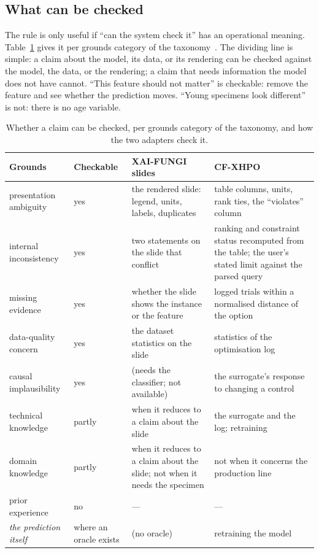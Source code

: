 \documentclass[preprint,12pt,3p,times]{elsarticle}
\begin{document}
\subsection{What can be checked}
\label{sec:checkable}

The rule is only useful if ``can the system check it'' has an operational meaning. Table~\ref{tab:grounds} gives it per grounds category of the taxonomy~\cite{phase1}. The dividing line is simple: a claim about the model, its data, or its rendering can be checked against the model, the data, or the rendering; a claim that needs information the model does not have cannot. ``This feature should not matter'' is checkable: remove the feature and see whether the prediction moves. ``Young specimens look different'' is not: there is no age variable.

\begin{table}[t]
\centering
\caption{Whether a claim can be checked, per grounds category of the taxonomy, and how the two adapters check it.}
\label{tab:grounds}
\small
\begin{tabular}{llp{4.6cm}p{4.6cm}}
\toprule
Grounds & Checkable & XAI-FUNGI slides & CF-XHPO \\
\midrule
presentation ambiguity & yes & the rendered slide: legend, units, labels, duplicates & table columns, units, rank ties, the ``violates'' column \\
internal inconsistency & yes & two statements on the slide that conflict & ranking and constraint status recomputed from the table; the user's stated limit against the parsed query \\
missing evidence & yes & whether the slide shows the instance or the feature & logged trials within a normalised distance of the option \\
data-quality concern & yes & the dataset statistics on the slide & statistics of the optimisation log \\
causal implausibility & yes & (needs the classifier; not available) & the surrogate's response to changing a control \\
technical knowledge & partly & when it reduces to a claim about the slide & the surrogate and the log; retraining \\
domain knowledge & partly & when it reduces to a claim about the slide; not when it needs the specimen & not when it concerns the production line \\
prior experience & no & --- & --- \\
\midrule
\emph{the prediction itself} & where an oracle exists & (no oracle) & retraining the model \\
\bottomrule
\end{tabular}
\end{table}
\end{document}
